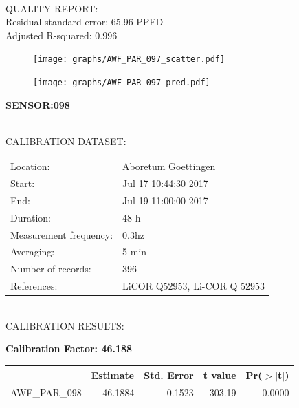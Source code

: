 \documentclass[oneside]{report}
\begin{document}
\hrulefill\\
QUALITY REPORT:\\
Residual standard error: 65.96 PPFD\\
Adjusted R-squared: 0.996



\begin{figure}[H]
  \centering
  \texttt{[image: graphs/AWF\_PAR\_097\_scatter.pdf]}
\end{figure}




\begin{figure}[H]
  \centering
  \texttt{[image: graphs/AWF\_PAR\_097\_pred.pdf]}
\end{figure}

\pagebreak


\begin{center}
\large{\textbf{SENSOR:098}}\\
\end{center}

\hrulefill\\
CALIBRATION DATASET:\\
\begin{table}[h!]
  \centering
  \label{tab:table1}
  \begin{tabular}{ll}
    Location: & Aboretum Goettingen\\ 
    
    
    Start:  & Jul 17 10:44:30 2017 \\
    End:   & Jul 19 11:00:00 2017\\ 
    Duration: & 48 h\\
    Measurement frequency: & 0.3hz\\
    Averaging:  &5 min\\
    Number of records: & 396 \\
    References: & LiCOR Q52953, Li-COR Q 52953 \\
  \end{tabular}
\end{table}

\hrulefill\\
CALIBRATION RESULTS:\\


\begin{center}
\textbf{\large{Calibration Factor: 46.188}}\\
\end{center}
\begin{table}[ht]
\centering
\begin{tabular}{rrrrr}
  \hline
 & Estimate & Std. Error & t value & Pr($>$$|$t$|$) \\ 
  \hline
AWF\_PAR\_098 & 46.1884 & 0.1523 & 303.19 & 0.0000 \\ 
   \hline
\end{tabular}
\end{table}
\end{document}
